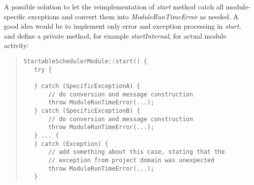 \documentclass[a4paper,twoside]{tce}
\begin{document}
A possible solution to let the reimplementation of \emph{start} method catch
all module-specific exceptions and convert them into
\emph{ModuleRunTimeError} as needed. A good idea would be to implement only
error and exception processing in \emph{start}, and define a private method,
for example \emph{startInternal}, for actual module activity:
\begin{quote}
\begin{verbatim}
StartableSchedulerModule::start() {
   try {

   } catch (SpecificExceptionA) {
       // do conversion and message construction
       throw ModuleRunTimeError(...);
   } catch (SpecificExceptionB) {
       // do conversion and message construction
       throw ModuleRunTimeError(...);
   } ... {
   } catch (Exception) {
       // add something about this case, stating that the
       // exception from project domain was unexpected
       throw ModuleRunTimeError(...);
   }
\end{verbatim}
\end{quote}



\cleardoublepage

\end{document}
